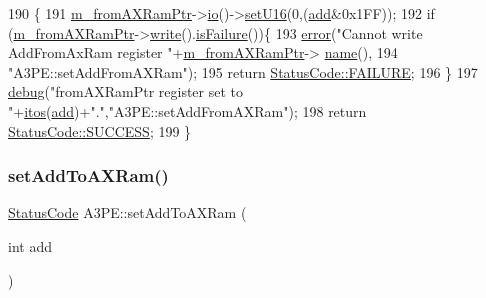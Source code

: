 \begin{DoxyCode}
190                                        \{
191   \hyperlink{classA3PE_a27ae9467bc128e46dd80443245df096a}{m\_fromAXRamPtr}->\hyperlink{classIOobject_af04fb94137c3d86849f478ac5afab5d1}{io}()->\hyperlink{classIOdata_aa9ade5ce3944c8e2b831533b6f876caf}{setU16}(0,(\hyperlink{classAttrib_a235f773af19c900264a190b00a3b4ad7}{add}&0x1FF));
192   \textcolor{keywordflow}{if} (\hyperlink{classA3PE_a27ae9467bc128e46dd80443245df096a}{m\_fromAXRamPtr}->\hyperlink{classIOobject_a9f6984bc9f0fadcf800f1be2523ac744}{write}().\hyperlink{classStatusCode_a5dd22dc6eb2c52fc4cabc58f6dea2eb7}{isFailure}())\{
193       \hyperlink{classObject_a204a95f57818c0f811933917a30eff45}{error}(\textcolor{stringliteral}{"Cannot write AddFromAxRam register "}+\hyperlink{classA3PE_a27ae9467bc128e46dd80443245df096a}{m\_fromAXRamPtr}->
      \hyperlink{classObject_a300f4c05dd468c7bb8b3c968868443c1}{name}(),
194           \textcolor{stringliteral}{"A3PE::setAddFromAXRam"});
195       \textcolor{keywordflow}{return} \hyperlink{classStatusCode_a6f565cbeadc76d14c72f047e5e85eb4ba3da73d4c469762eb9d3c960368252b26}{StatusCode::FAILURE};
196   \}
197   \hyperlink{classObject_aac010553f022165573714b7014a15f0d}{debug}(\textcolor{stringliteral}{"fromAXRamPtr register set to "}+\hyperlink{Tools_8h_af330027dbdafb9a30768b3613c553e60}{itos}(\hyperlink{classAttrib_a235f773af19c900264a190b00a3b4ad7}{add})+\textcolor{stringliteral}{"."},\textcolor{stringliteral}{"A3PE::setAddFromAXRam"});
198   \textcolor{keywordflow}{return} \hyperlink{classStatusCode_a6f565cbeadc76d14c72f047e5e85eb4badd0da38d3ba0d922efd1f4619bc37ad8}{StatusCode::SUCCESS};
199 \}
\end{DoxyCode}
\mbox{\label{classA3PE_a54fe4da570ea8833fe2c981de1085387}} 
\subsubsection{\texorpdfstring{set\+Add\+To\+A\+X\+Ram()}{setAddToAXRam()}}
{\footnotesize\ttfamily \hyperlink{classStatusCode}{Status\+Code} A3\+P\+E\+::set\+Add\+To\+A\+X\+Ram (\begin{DoxyParamCaption}\item[{int}]{add }\end{DoxyParamCaption})}



